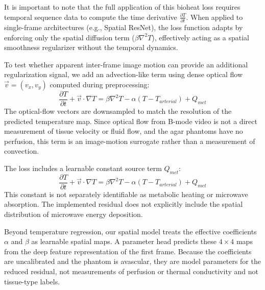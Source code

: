 It is important to note that the full application of this bioheat loss requires temporal sequence data to compute the time derivative $\frac{\partial T}{\partial t}$. 
When applied to single-frame architectures (e.g., Spatial ResNet), the loss function adapts by enforcing only the spatial diffusion term ($\beta \nabla^2 T$), effectively acting as a spatial smoothness regularizer without the temporal dynamics.

To test whether apparent inter-frame image motion can provide an additional regularization signal, we add an advection-like term using dense optical flow $\vec{v} = (v_x, v_y)$ computed during preprocessing:
\begin{equation}
    \frac{\partial T}{\partial t} + \vec{v} \cdot \nabla T = \beta \nabla^2 T - \alpha(T - T_{arterial}) + Q_{met}
\end{equation}
The optical-flow vectors are downsampled to match the resolution of the predicted temperature map. 
Since optical flow from B-mode video is not a direct measurement of tissue velocity or fluid flow, and the agar phantoms have no perfusion, this term is an image-motion surrogate rather than a measurement of convection.

The loss includes a learnable constant source term $Q_{met}$:
\begin{equation}
    \frac{\partial T}{\partial t} + \vec{v} \cdot \nabla T = \beta \nabla^2 T - \alpha(T - T_{arterial}) + Q_{met}
\end{equation}
This constant is not separately identifiable as metabolic heating or microwave absorption.
The implemented residual does not explicitly include the spatial distribution of microwave energy deposition.

Beyond temperature regression, our spatial model treats the effective coefficients $\alpha$ and $\beta$ as learnable spatial maps.
A parameter head predicts these $4\times4$ maps from the deep feature representation of the first frame.
Because the coefficients are uncalibrated and the phantom is avascular, they are model parameters for the reduced residual, not measurements of perfusion or thermal conductivity and not tissue-type labels.



